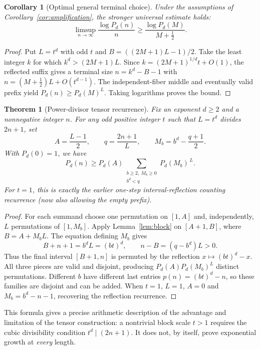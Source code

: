 \documentclass[10pt]{article}
\newtheorem{theorem}{Theorem}
\newtheorem{corollary}{Corollary}
\begin{document}
\begin{corollary}[Optimal general terminal choice]
\label{cor:optimal-general}
Under the assumptions of
Corollary~\ref{cor:amplification},
the stronger universal estimate holds:
\[
\boxed{\displaystyle
\limsup_{n\to\infty}
\frac{\log P_d(n)}n
\ge\frac{\log P_d(M)}{M+\frac12}.}
\]
\end{corollary}
\begin{proof}
Put $L=t^d$ with odd $t$ and
$B=((2M+1)L-1)/2$. Take the least
integer $k$ for which
$k^d>(2M+1)L$. Since
$k=(2M+1)^{1/d}t+O(1)$, the
reflected suffix gives a terminal
size $n=k^d-B-1$ with
$n=(M+\tfrac12)L+O(t^{d-1})$.
The independent-fiber middle and
eventually valid prefix yield
$P_d(n)\ge P_d(M)^L$.
Taking logarithms proves the bound.
\end{proof}

\begin{theorem}[Power-divisor tensor recurrence]\label{thm:divisor-recurrence}
Fix an exponent $d\ge2$ and a nonnegative
integer $n$. For any odd positive integer $t$
such that $L=t^d$ divides $2n+1$, set
\[
A=\frac{L-1}{2},\qquad
q=\frac{2n+1}{L},
\qquad M_b=b^d-\frac{q+1}{2}.
\]
With $P_d(0)=1$, we have
\begin{equation}\label{eq:divisor-recurrence}
\boxed{\displaystyle
P_d(n)\ge P_d(A)
\!\!\!\sum_{\substack{b\ge2,\ M_b\ge0\\b^d<q}}
P_d(M_b)^{\,L}.}
\end{equation}
For $t=1$, this is exactly the earlier
one-step interval-reflection counting
recurrence (now also allowing the empty prefix).
\end{theorem}
\begin{proof}
For each summand choose one permutation on
$[1,A]$ and, independently, $L$ permutations
of $[1,M_b]$. Apply
Lemma~\ref{lem:block} on
$[A+1,B]$, where $B=A+M_bL$.
The equation defining $M_b$ gives
\[
B+n+1=b^dL=(bt)^d,\qquad
n-B=(q-b^d)L>0.
\]
Thus the final interval $[B+1,n]$ is
permuted by the reflection
$x\mapsto(bt)^d-x$. All three pieces
are valid and disjoint, producing
$P_d(A)P_d(M_b)^L$ distinct permutations.
Different $b$ have different last
entries $p(n)=(bt)^d-n$, so these
families are disjoint and can be added.
When $t=1$, $L=1$, $A=0$ and
$M_b=b^d-n-1$, recovering the reflection
recurrence.
\end{proof}

This formula gives a precise arithmetic
description of the advantage and limitation
of the tensor construction: a nontrivial
block scale $t>1$ requires the cubic
divisibility condition $t^d\mid(2n+1)$.
It does not, by itself, prove exponential
growth at \emph{every} length.
\end{document}
